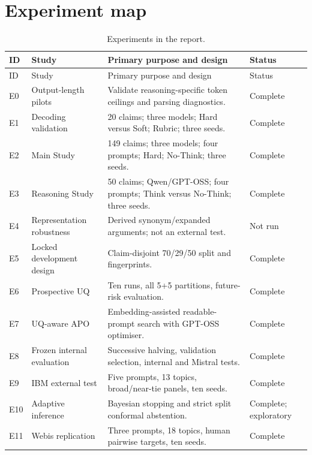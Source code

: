 \documentclass[11pt,twoside,a4paper]{report}
\begin{document}
\section{Experiment map}

\begin{longtable}{@{}p{}p{}p{}p{}@{}}
\caption{Experiments in the report.}\label{tab:experiment-map}\\
\toprule
ID & Study & Primary purpose and design & Status \\
\midrule
\endfirsthead
\toprule
ID & Study & Primary purpose and design & Status \\
\midrule
\endhead
E0 & Output-length pilots & Validate reasoning-specific token ceilings and parsing diagnostics. & Complete \\
E1 & Decoding validation & 20 claims; three models; Hard versus Soft; Rubric; three seeds. & Complete \\
E2 & Main Study & 149 claims; three models; four prompts; Hard; No-Think; three seeds. & Complete \\
E3 & Reasoning Study & 50 claims; Qwen/GPT-OSS; four prompts; Think versus No-Think; three seeds. & Complete \\
E4 & Representation robustness & Derived synonym/expanded arguments; not an external test. & Not run \\
E5 & Locked development design & Claim-disjoint 70/29/50 split and fingerprints. & Complete \\
E6 & Prospective UQ & Ten runs, all 5+5 partitions, future-risk evaluation. & Complete \\
E7 & UQ-aware APO & Embedding-assisted readable-prompt search with GPT-OSS optimiser. & Complete \\
E8 & Frozen internal evaluation & Successive halving, validation selection, internal and Mistral tests. & Complete \\
E9 & IBM external test & Five prompts, 13 topics, broad/near-tie panels, ten seeds. & Complete \\
E10 & Adaptive inference & Bayesian stopping and strict split conformal abstention. & Complete; exploratory \\
E11 & Webis replication & Three prompts, 18 topics, human pairwise targets, ten seeds. & Complete \\
\bottomrule
\end{longtable}

\end{document}
